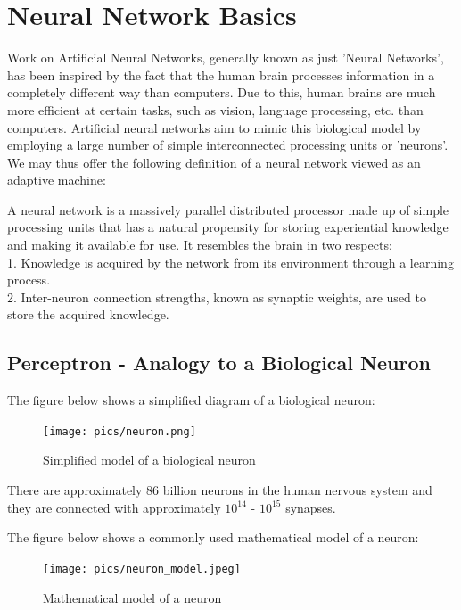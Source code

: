 \documentclass[twoside]{article}
\begin{document}
\section{Neural Network Basics}
Work on Artificial Neural Networks, generally known as just 'Neural Networks', has been inspired by the fact that the human brain processes information in a completely different way than computers. Due to this, human brains are much more efficient at certain tasks, such as vision, language processing, etc. than computers. Artificial neural networks aim to mimic this biological model by employing a large number of simple interconnected processing units or 'neurons'.  We may thus offer the following definition of a neural network viewed as an adaptive machine\cite{haykin}:

A neural network is a massively parallel distributed processor made up of simple processing units that has a natural propensity for storing experiential knowledge and making it available for use. It resembles the brain in two respects:\\
1. Knowledge is acquired by the network from its environment through a learning process.\\
2. Inter-neuron connection strengths, known as synaptic weights, are used to store the acquired knowledge.

\subsection{Perceptron - Analogy to a Biological Neuron}
The figure below shows a simplified diagram of a biological neuron:

\begin{figure}[!htb]
\centering
\texttt{[image: pics/neuron.png]}
\caption{Simplified model of a biological neuron\cite{cs231n-website}}
\label{fig:bio-neuron}
\end{figure}

There are approximately 86 billion neurons in the human nervous system and they are connected with approximately $10^{14}$ - $10^{15}$ synapses\cite{cs231n-website}.

The figure below shows a commonly used mathematical model of a neuron:

\begin{figure}[!htb]
\centering
\texttt{[image: pics/neuron\_model.jpeg]}
\caption{Mathematical model of a neuron\cite{cs231n-website}}
\label{fig:neuron_model}
\end{figure}
\end{document}

